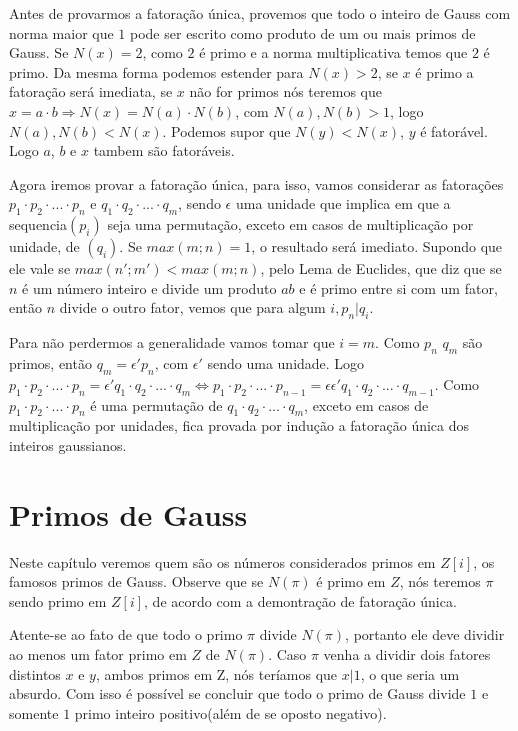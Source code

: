 Antes de provarmos a fatora\c{c}\~ao \'unica, provemos que todo o inteiro de Gauss com norma maior que $1$ pode ser escrito como produto de um ou mais primos de Gauss. Se $N(x)=2$, como $2$ \'e primo e a norma multiplicativa temos que $2$ \'e primo. Da mesma forma podemos estender para $N(x)>2$, se $x$ \'e primo a fatora\c{c}\~ao ser\'a imediata, se $x$ n\~ao for primos n\'os teremos que $x=a \cdot b \Rightarrow N(x) = N(a) \cdot N(b)$, com $ N(a), N(b) > 1$, logo $ N(a), N(b) < N(x)$. Podemos supor que $N(y) < N(x)$, $y$ \'e fator\'avel. Logo $a$, $b$ e $x$ tambem s\~ao fator\'aveis.

Agora iremos provar a fatora\c{c}\~ao \'unica, para isso, vamos considerar as fatora\c{c}\~oes $p_1 \cdot p_2 \cdot ... \cdot p_n$ e $q_1 \cdot q_2 \cdot ... \cdot q_m$, sendo $\epsilon$  uma unidade que implica em que a sequencia$(p_i)$ seja uma permuta\c{c}\~ao, exceto em casos de multiplica\c{c}\~ao por unidade, de $(q_i)$. Se $max(m;n) = 1$, o resultado ser\'a imediato. Supondo que ele vale se $max(n';m') < max(m;n)$, pelo Lema de Euclides, que diz que se $n$ \'e um n\'umero inteiro e divide um produto $ab$ e \'e primo entre si com um fator, ent\~ao $n$ divide o outro fator, vemos que para algum $i, p_n| q_i$.

Para n\~ao perdermos a generalidade vamos tomar que $i=m$. Como $p_n$  $q_m$ s\~ao primos, ent\~ao $q_m = \epsilon' p_n$, com $\epsilon'$ sendo uma unidade. Logo $p_1 \cdot p_2 \cdot ... \cdot p_n = \epsilon'q_1 \cdot q_2 \cdot ... \cdot q_m \Leftrightarrow p_1 \cdot p_2 \cdot ... \cdot p_{n-1} = \epsilon\epsilon'q_1 \cdot q_2 \cdot ... \cdot q_{m-1} $. Como $p_1 \cdot p_2 \cdot ... \cdot p_n$ \'e uma permuta\c{c}\~ao de $q_1 \cdot q_2 \cdot ... \cdot q_m$, exceto em casos de multiplica\c{c}\~ao por unidades, fica provada por indu\c{c}\~ao a fatora\c{c}\~ao \'unica dos inteiros gaussianos.

\section{Primos de Gauss}

\hspace{7mm}Neste cap\'itulo veremos quem s\~ao os n\'umeros considerados primos em $Z[i]$, os famosos primos de Gauss. Observe que se $N(\pi)$ \'e primo em $Z$, n\'os teremos $\pi$ sendo primo em $Z[i]$, de acordo com a demontra\c{c}\~ao de fatora\c{c}\~ao \'unica. 

Atente-se ao fato de que todo o primo $\pi$ divide $N(\pi)$, portanto ele deve dividir ao menos um fator primo em $Z$ de $N(\pi)$. Caso $\pi$ venha a dividir dois fatores distintos $x$ e $y$, ambos primos em Z, n\'os ter\'iamos que $x|1$, o que seria um absurdo. Com isso \'e poss\'ivel se concluir que todo o primo de Gauss divide $1$ e somente $1$ primo inteiro positivo(al\'em de se oposto negativo).

